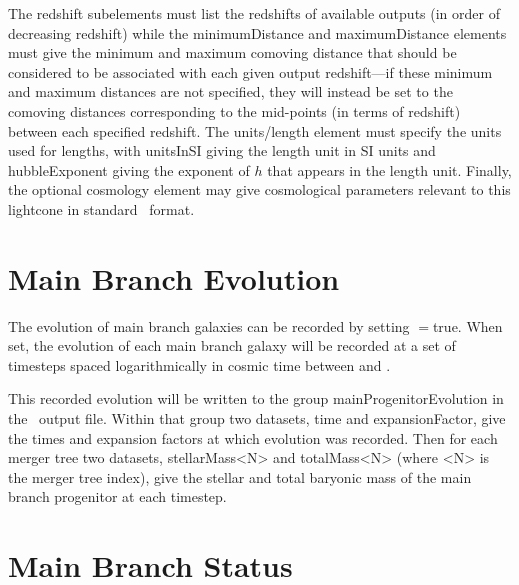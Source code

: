  The {\normalfont \ttfamily redshift} subelements must list the redshifts of available outputs (in order of decreasing redshift) while the {\normalfont \ttfamily minimumDistance} and {\normalfont \ttfamily maximumDistance} elements must give the minimum and maximum comoving distance that should be considered to be associated with each given output redshift---if these minimum and maximum distances are not specified, they will instead be set to the comoving distances corresponding to the mid-points (in terms of redshift) between each specified redshift. The {\normalfont \ttfamily units/length} element must specify the units used for lengths, with {\normalfont \ttfamily unitsInSI} giving the length unit in SI units and {\normalfont \ttfamily hubbleExponent} giving the exponent of $h$ that appears in the length unit. Finally, the optional {\normalfont \ttfamily cosmology} element may give cosmological parameters relevant to this lightcone in standard \glc\ format.

\section{Main Branch Evolution}

The evolution of main branch galaxies can be recorded by setting {\normalfont \ttfamily [timestepRecordEvolution]}$=${\normalfont \ttfamily true}. When set, the evolution of each main branch galaxy will be recorded at a set of {\normalfont \ttfamily [timestepRecordEvolutionSteps]} timesteps spaced logarithmically in cosmic time between {\normalfont \ttfamily [timestepRecordEvolutionBegin]} and \newline {\normalfont \ttfamily [timestepRecordEvolutionEnd]}. 

This recorded evolution will be written to the group {\normalfont \ttfamily mainProgenitorEvolution} in the \glc\ output file. Within that group two datasets, {\normalfont \ttfamily time} and {\normalfont \ttfamily expansionFactor}, give the times and expansion factors at which evolution was recorded. Then for each merger tree two datasets, {\normalfont \ttfamily stellarMass<N>} and {\normalfont \ttfamily totalMass<N>} (where {\normalfont \ttfamily <N>} is the merger tree index), give the stellar and total baryonic mass of the main branch progenitor at each timestep.

\section{Main Branch Status}

